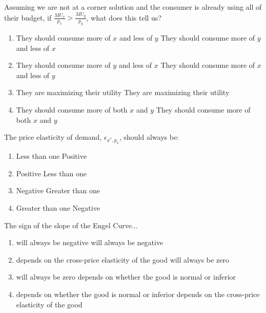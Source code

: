 \begin{question}[type=exam]{4}
  Assuming we are not at a corner solution and the consumer is already using all of their budget,
  if $\frac{MU_x}{p_x} > \frac{MU_y}{p_y}$, what does this tell us?
  \begin{enumerate}[label=\alph*), noitemsep]
    \item \vary
      {They should consume more of $x$ and less of $y$} %
      {They should consume more of $y$ and less of $x$}
    \item \vary
      {They should consume more of $y$ and less of $x$}
      {They should consume more of $x$ and less of $y$} %
    \item \vary
      {They are maximizing their utility}
      {They are maximizing their utility}
    \item \vary
      {They should consume more of both $x$ and $y$}
      {They should consume more of both $x$ and $y$}
  \end{enumerate}
\end{question}

\newpage

\begin{question}[type=exam]{4}
  The price elasticity of demand, $\epsilon_{x^*,p_x}$, should always be:
  \begin{enumerate}[label=\alph*), noitemsep]
    \item \vary
      {Less than one}
      {Positive}
    \item \vary
      {Positive}
      {Less than one}
    \item \vary
      {Negative} %
      {Greater than one}
    \item \vary
      {Greater than one}
      {Negative} %
  \end{enumerate}
\end{question}

\begin{question}[type=exam]{4}
  The sign of the slope of the Engel Curve...
  \begin{enumerate}[label=\alph*), noitemsep]
    \item \vary
      {will always be negative}
      {will always be negative}
    \item \vary
      {depends on the cross-price elasticity of the good}
      {will always be zero}
    \item \vary
      {will always be zero}
      {depends on whether the good is normal or inferior} %
    \item \vary
      {depends on whether the good is normal or inferior} %
      {depends on the cross-price elasticity of the good}
  \end{enumerate}
\end{question}

